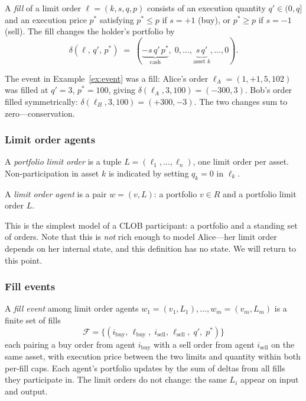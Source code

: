 \begin{definition}[Fill]\label{def:fill}
A \emph{fill} of a limit order $\ell = (k, s, q, p)$ consists of an execution quantity $q' \in (0,q]$ and an execution price $p^*$ satisfying $p^* \leq p$ if $s = +1$ (buy), or $p^* \geq p$ if $s = -1$ (sell).  The fill changes the holder's portfolio by
\[
\delta(\ell,\, q',\, p^*) \;=\; (\underbrace{-s\,q'\,p^*}_{\text{cash}},\; 0, \ldots, \underbrace{s\,q'}_{\text{asset } k}, \ldots, 0).
\]
\end{definition}

The event in Example~\ref{ex:event} was a fill: Alice's order $\ell_A = (1,+1,5,102)$ was filled at $q' = 3$, $p^* = 100$, giving $\delta(\ell_A, 3, 100) = (-300, 3)$.  Bob's order filled symmetrically: $\delta(\ell_B, 3, 100) = (+300, -3)$.  The two changes sum to zero---conservation.

\subsubsection*{Limit order agents}

\begin{definition}
A \emph{portfolio limit order} is a tuple $L = (\ell_1, \ldots, \ell_n)$, one limit order per asset.  Non-participation in asset $k$ is indicated by setting $q_k = 0$ in $\ell_k$.
\end{definition}

\begin{definition}
A \emph{limit order agent} is a pair $w = (v, L)$: a portfolio $v \in R$ and a portfolio limit order $L$.
\end{definition}

This is the simplest model of a CLOB participant: a portfolio and a standing set of orders.  Note that this is \emph{not} rich enough to model Alice---her limit order depends on her internal state, and this definition has no state.  We will return to this point.

\subsubsection*{Fill events}

\begin{definition}\label{def:fill-event}
A \emph{fill event} among limit order agents $w_1 = (v_1, L_1), \ldots, w_m = (v_m, L_m)$ is a finite set of fills
\[
\mathcal{F} = \bigl\{(i_{\mathrm{buy}},\, \ell_{\mathrm{buy}},\; i_{\mathrm{sell}},\, \ell_{\mathrm{sell}},\; q',\; p^*)\bigr\}
\]
each pairing a buy order from agent $i_{\mathrm{buy}}$ with a sell order from agent $i_{\mathrm{sell}}$ on the same asset, with execution price between the two limits and quantity within both per-fill caps.  Each agent's portfolio updates by the sum of deltas from all fills they participate in.  The limit orders do not change: the same $L_i$ appear on input and output.
\end{definition}

